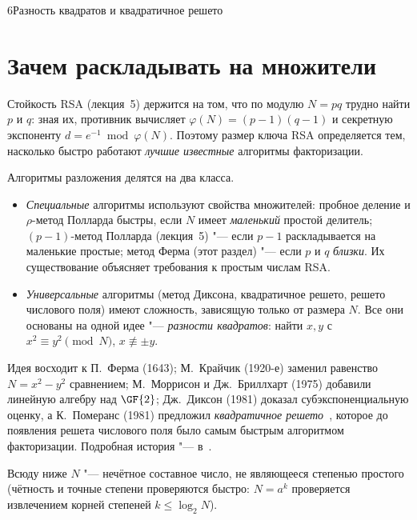 \begin{lecture}{6}{Разность квадратов и квадратичное решето}

\section{Зачем раскладывать на множители}

Стойкость RSA (лекция~5) держится на том, что по модулю $N = pq$ трудно найти $p$ и $q$: зная
их, противник вычисляет $\varphi(N) = (p - 1)(q - 1)$ и секретную экспоненту
$d = e^{-1} \bmod \varphi(N)$. Поэтому размер ключа RSA определяется тем, насколько быстро
работают \emph{лучшие известные} алгоритмы факторизации.

Алгоритмы разложения делятся на два класса.
\begin{itemize}
  \item \emph{Специальные} алгоритмы используют свойства множителей: пробное деление и
    $\rho$-метод Полларда быстры, если $N$ имеет \emph{маленький} простой делитель; $(p - 1)$-метод
    Полларда (лекция~5) "--- если $p - 1$ раскладывается на маленькие простые; метод Ферма (этот
    раздел) "--- если $p$ и $q$ \emph{близки}. Их существование объясняет требования к
    простым числам RSA.
  \item \emph{Универсальные} алгоритмы (метод Диксона, квадратичное решето, решето числового поля)
    имеют сложность, зависящую только от размера $N$. Все они основаны на одной идее "---
    \emph{разности квадратов}: найти $x, y$ с $x^2 \equiv y^2 \pmod N$, $x \not\equiv \pm y$.
\end{itemize}

Идея восходит к П.~Ферма (1643); М.~Крайчик (1920-е) заменил равенство $N = x^2 - y^2$
сравнением; М.~Моррисон и Дж.~Бриллхарт (1975) добавили линейную алгебру над $\GF{2}$;
Дж.~Диксон (1981) доказал субэкспоненциальную оценку, а К.~Померанс (1981) предложил
\emph{квадратичное решето}~\cite{pomerance-qs}, которое до появления решета числового поля
было самым быстрым алгоритмом факторизации. Подробная история "--- в~\cite{pomerance-two-sieves}.

Всюду ниже $N$ "--- нечётное составное число, не являющееся степенью простого (чётность и
точные степени проверяются быстро: $N = a^k$ проверяется извлечением корней степеней
$k \le \log_2 N$).


\end{lecture}
